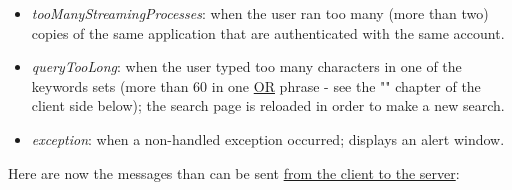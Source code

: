 \documentclass[a4paper,11pt]{report}
\begin{document}
\begin{itemize}
\begin{itemize}
	\item \emph{tooManyStreamingProcesses}: when the user ran too many (more than two) copies of the same application that are authenticated with the same account.
	\item \emph{queryTooLong}: when the user typed too many characters in one of the keywords sets (more than 60 in one \underline{OR} phrase - see the "" chapter of the client side below); the search page is reloaded in order to make a new search.
	\item \emph{exception}: when a non-handled exception occurred; displays an alert window.
	\end{itemize}
\end{itemize}
\bigskip
\newpage

Here are now the messages than can be sent \underline{from the client to the server}:
\end{document}
